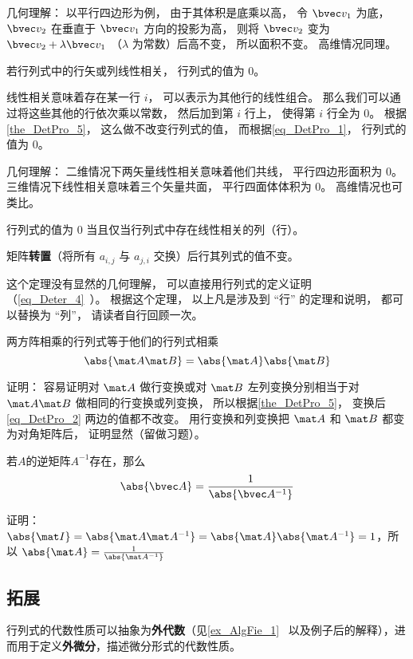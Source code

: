 几何理解： 以平行四边形为例， 由于其体积是底乘以高， 令 $\bvec v_1$ 为底， $\bvec v_2$ 在垂直于 $\bvec v_1$ 方向的投影为高， 则将 $\bvec v_2$ 变为 $\bvec v_2 + \lambda \bvec v_1$ （$\lambda$ 为常数）后高不变， 所以面积不变。 高维情况同理。

\begin{theorem}{ }\label{the_DetPro_9}
若行列式中的行矢或列线性相关， 行列式的值为 0。
\end{theorem}
线性相关意味着存在某一行 $i$， 可以表示为其他行的线性组合。 那么我们可以通过将这些其他的行依次乘以常数， 然后加到第 $i$ 行上， 使得第 $i$ 行全为 0。 根据\autoref{the_DetPro_5}， 这么做不改变行列式的值， 而根据\autoref{eq_DetPro_1}， 行列式的值为 0。

几何理解： 二维情况下两矢量线性相关意味着他们共线， 平行四边形面积为 0。 三维情况下线性相关意味着三个矢量共面， 平行四面体体积为 0。 高维情况也可类比。

\begin{theorem}{ } \label{the_DetPro_2}
行列式的值为 0 当且仅当行列式中存在线性相关的列（行）。
\end{theorem}

\begin{theorem}{ }\label{the_DetPro_7}
矩阵\textbf{转置}（将所有 $a_{i,j}$ 与 $a_{j,i}$ 交换）后行其列式的值不变。
\end{theorem}
这个定理没有显然的几何理解， 可以直接用行列式的定义证明（\autoref{eq_Deter_4}~）。 根据这个定理， 以上凡是涉及到 “行” 的定理和说明， 都可以替换为 “列”， 请读者自行回顾一次。

\begin{theorem}{}\label{the_DetPro_8}
两方阵相乘的行列式等于他们的行列式相乘
\begin{equation}\label{eq_DetPro_2}
\abs{\mat A \mat B} = \abs{\mat A}\abs{\mat B}
\end{equation}
\end{theorem}
证明： 容易证明对 $\mat A$ 做行变换或对 $\mat B$ 左列变换分别相当于对 $\mat A\mat B$ 做相同的行变换或列变换， 所以根据\autoref{the_DetPro_5}， 变换后\autoref{eq_DetPro_2} 两边的值都不改变。 用行变换和列变换把 $\mat A$ 和 $\mat B$ 都变为对角矩阵后， 证明显然（留做习题）。

\begin{theorem}{}
若$A$的逆矩阵$A^{-1}$存在，那么
\begin{equation}
\abs{\bvec A}=\frac{1}{\abs{\bvec A^{-1}}}
\end{equation}
\end{theorem}
证明：
$\abs{\mat I} = \abs{\mat A \mat A^{-1}} = \abs{\mat A}\abs{\mat A^{-1}}=1$，所以
$\abs{\mat A}=\frac{1}{\abs{\mat A^{-1}}}$

\subsection{拓展}

行列式的代数性质可以抽象为\textbf{外代数}（见\autoref{ex_AlgFie_1}~ 以及例子后的解释），进而用于定义\textbf{外微分}，描述微分形式的代数性质。
